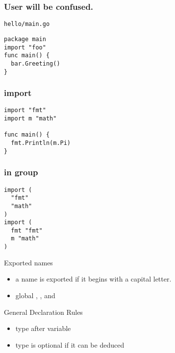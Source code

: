 \documentclass[xetex,mathserif,serif,12pt]{beamer}
\begin{document}
\begin{frame}[fragile]
  \frametitle{User will be confused.}

  \begin{beamer@nomargin@title}
    \texttt{hello/main.go}
  \end{beamer@nomargin@title}

  \begin{beamer@nomargin}
    \begin{lstlisting}[basicstyle=\small\ttfamily]
package main
import "foo"
func main() {
  bar.Greeting()
}
    \end{lstlisting}
  \end{beamer@nomargin}
\end{frame}

\begin{frame}[fragile]
  \frametitle{\ttfamily import}

  \begin{beamer@nomargin}
    \begin{lstlisting}[basicstyle=\small\ttfamily]
import "fmt"
import m "math"

func main() {
  fmt.Println(m.Pi)
}
    \end{lstlisting}
  \end{beamer@nomargin}
\end{frame}

\begin{frame}[fragile]
  \frametitle{in group}

  \begin{beamer@nomargin}
    \begin{lstlisting}[basicstyle=\small\ttfamily]
import (
  "fmt"
  "math"
)
import (
  fmt "fmt"
  m "math"
)
    \end{lstlisting}
  \end{beamer@nomargin}
\end{frame}

\begin{frame}{Exported names}
  \begin{itemize}
  \item a name is exported if it begins with a capital letter.
  \item global , ,  and
  \end{itemize}
\end{frame}

\begin{frame}{General Declaration Rules}

  \begin{itemize}
  \item type after variable
  \item type is optional if it can be deduced
  \end{itemize}

\end{frame}
\end{document}
